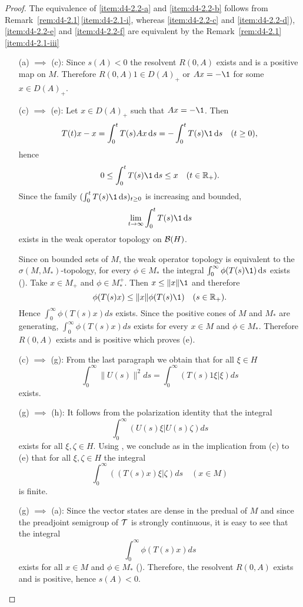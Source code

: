 \begin{proof}
The equivalence of \ref{item:d4-2.2-a} and \ref{item:d4-2.2-b} follows from Remark~\ref{rem:d4-2.1}\,\ref{item:d4-2.1-i}, whereas \ref{item:d4-2.2-c} and \ref{item:d4-2.2-d}), \resp  \ref{item:d4-2.2-e} and \ref{item:d4-2.2-f} are equivalent by the Remark~\ref{rem:d4-2.1}\,\ref{item:d4-2.1-iii}
\begin{enumerate}[wide, labelindent=.5em]

\item[(a) $\implies$ (c):] Since $s(A) < 0$ the resolvent $R(0,A)$ exists and is a positive map on $M$.
Therefore $R(0,A)1 \in D(A)_{+}$ or $Ax = -\1$ for some $x \in D(A)_{+}$.


\item[(c) $\implies$ (e):] Let $x \in D(A)_{+}$ such that $Ax = -\1$.
Then
\[
T(t)x - x = \int_{0}^{t} T(s)Ax \ds = -\int_{0}^{t} T(s) \1 \ds \quad (t \geq 0),
\]
hence
\[
0 \leq \int_{0}^{t} T(s) \1 \ds \leq x \quad (t \in \R_{+}).
\]
Since the family $(\int_{0}^{t} T(s)\1 \ds)_{t \geq 0}$ is increasing and bounded, 
%
\[
	\lim_{t \to \infty} \int_{0}^{t} T(s) \1 \ds
\]
%
exists in the weak operator topology on $\mathcal{B}(H)$.

Since on bounded sets of $M$, the weak operator topology is equivalent to the $\sigma(M,M_{*})$-topology, for every $\phi \in M_{*}$ the integral $ \int_{0}^{\infty}\phi(T(s) \1) \ds $ exists (\citet[1.15.2.]{sakai:1971}).
Take $x \in M_{+}$ and $\phi \in M_{*}^{+}$.
Then $x \leq \|x\| \1$ and therefore
\[
	\phi(T(s)x) \leq \|x\|\phi(T(s) \1) \quad (s \in \R_{+}).
\]
Hence $\int_{0}^{\infty} \phi(T(s)x)ds$ exists.
Since the positive cones of $M$ and $M_{*}$ are generating, $\int_{0}^{\infty}\phi(T(s)x)ds$ exists for every $x \in M$ and $\phi \in M_{*}$.
Therefore $R(0,A)$ exists and is positive which proves (e).

\item[(c) $\implies$ (g):] From the last paragraph we obtain that for all $\xi \in H$
\[
\int_{0}^{\infty}\|U(s)\|^2ds = \int_{0}^{\infty}(T(s)1\xi|\xi)ds
\]
exists.

\item[(g) $\implies$ (h):] It follows from the polarization identity that the integral
\[
\int_{0}^{\infty}(U(s)\xi|U(s)\zeta)ds
\]
exists for all $\xi,\zeta \in H$.
Using \citet[Theorem III.4.2 and Theorem II.2.6]{takesaki:1979}, we conclude as in the implication from (c) to (e) that for all $\xi,\zeta \in H$ the integral
\[
\int_{0}^{\infty}((T(s)x)\xi|\zeta)ds \quad (x \in M)
\]
is finite.

\item[(g) $\implies$ (a):] Since the vector states are dense in the predual of $M$ and since the preadjoint semigroup of\/ $\mathcal{T}$ is strongly continuous, it is easy to see that the integral
\[
\int_{0}^{\infty} \phi(T(s)x)ds
\]
exists for all $x \in M$ and $\phi \in M_{*}$ (\citet[Theorem II.2.6]{takesaki:1979}).
Therefore, the resolvent $R(0,A)$ exists and is positive, hence $s(A) < 0$.
\end{enumerate}
\end{proof}
